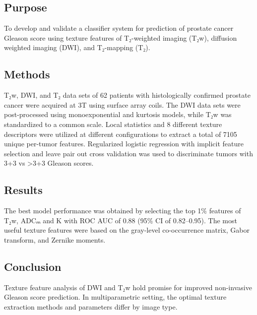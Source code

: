 
\subsection*{Purpose}

To develop and validate a classifier system for prediction of prostate cancer
Gleason score using texture features of T₂-weighted imaging (T₂w), diffusion
weighted imaging (DWI), and T₂-mapping (T₂).


\subsection*{Methods}

T₂w, DWI, and T₂ data sets of 62 patients with histologically confirmed prostate
cancer were acquired at 3T using surface array coils. The DWI data sets were
post-processed using monoexponential and kurtosis models, while T₂w was
standardized to a common scale. Local statistics and 8 different texture
descriptors were utilized at different configurations to extract a total of
7105 unique per-tumor features. Regularized logistic regression with implicit
feature selection and leave pair out cross validation was used to discriminate
tumors with 3+3 vs >3+3 Gleason scores.


\subsection*{Results}

The best model performance was obtained by selecting the top 1\% features of
T₂w, ADCₘ and K with ROC AUC of 0.88 (95\% CI of 0.82--0.95). The most useful
texture features were based on the gray-level co-occurrence matrix, Gabor
transform, and Zernike moments.


\subsection*{Conclusion}

Texture feature analysis of DWI and T₂w hold promise for improved non-invasive
Gleason score prediction. In multiparametric setting, the optimal texture
extraction methods and parameters differ by image type.
